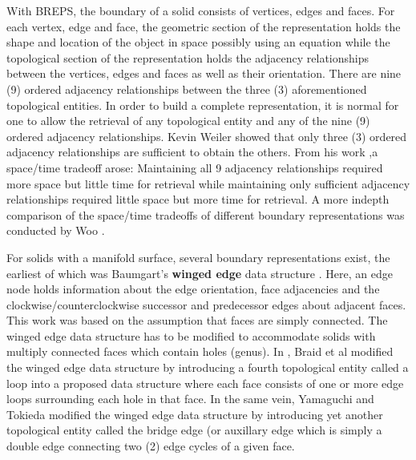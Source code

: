 \hspace{30} With   B­REPS,   the   boundary   of   a   solid   consists   of   vertices,   edges   and  
faces.   For   each   vertex,   edge   and   face,   the   geometric   section   of   the  
representation   holds   the   shape   and   location   of   the   object   in   space   possibly  
using   an   equation   while   the   topological   section   of   the   representation   holds   the  
adjacency   relationships   between   the   vertices,   edges   and   faces   as   well   as   their  
orientation.   There   are   nine   (9)   ordered   adjacency   relationships   between   the  
three   (3)   aforementioned   topological   entities.   In   order   to   build   a   complete  
representation,   it   is   normal   for   one   to   allow   the   retrieval   of   any   topological   entity  
and   any   of   the   nine   (9)   ordered   adjacency   relationships. Kevin Weiler \cite{14}  
showed   that   only   three   (3)   ordered   adjacency   relationships   are   sufficient   to  
obtain   the   others.   From   his   work   ,a   space/time   trade­off   arose:   Maintaining   all   9  
adjacency   relationships   required   more   space   but   little   time   for   retrieval   while  
maintaining   only   sufficient   adjacency   relationships   required   little   space   but  
more   time   for   retrieval.   A   more   indepth   comparison   of   the   space/time  
trade­offs of different boundary representations was conducted by Woo \cite{15}.  

\hspace{30} For   solids   with   a   manifold   surface,   several   boundary   representations  
exist,   the   earliest   of   which   was   Baumgart's   \textbf{winged ­edge}   data   structure   \cite{16}.  
Here,   an   edge   node   holds   information   about   the   edge   orientation,   face  
adjacencies   and   the   clockwise/counterclockwise   successor   and   predecessor  
edges   about   adjacent   faces.   This   work   was   based   on   the   assumption   that  
faces   are   simply   connected.   The   winged ­edge   data   structure   has   to   be  
modified   to   accommodate   solids   with   multiply   connected   faces   which   contain  
holes   (genus).   In   \cite{17},   Braid   et   al   modified   the   winged ­edge   data   structure   by  
introducing   a   fourth   topological   entity   called   a   loop   into   a   proposed   data  
structure   where   each   face   consists   of   one   or   more   edge   loops   surrounding  
each   hole   in   that   face.   In   the   same   vein,   Yamaguchi   and   Tokieda   \cite{18}   modified  
the   winged ­edge   data   structure   by   introducing   yet   another   topological   entity  
called   the   bridge   edge   (or   auxillary   edge   which   is   simply   a   double   edge 
connecting two (2) edge cycles of a given face.  

